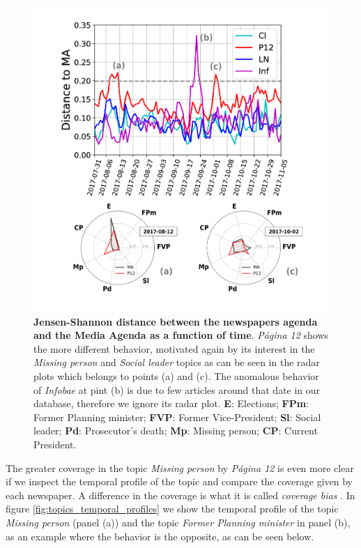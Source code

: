 \documentclass[a4paper, 12pt]{article}
\begin{document}
\begin{figure}[H]
\centering
\includegraphics[width = \textwidth]{images/Fig6.pdf}
\caption{\textbf{Jensen-Shannon distance between the newspapers agenda and the Media Agenda as a function of time}. \emph{P\'agina 12} shows the more different behavior, motivated again by its interest in the \emph{Missing person} and \emph{Social leader} topics as can be seen in the radar plots which belongs to points (a) and (c). The anomalous behavior of \emph{Infobae} at pint (b) is due to few articles around that date in our database, therefore we ignore its radar plot. \textbf{E}: Elections; \textbf{FPm}: Former Planning minister; \textbf{FVP}: Former Vice-President; \textbf{Sl}: Social leader; \textbf{Pd}: Prosecutor's death; \textbf{Mp}: Missing person; \textbf{CP}: Current President.}
\label{fig:jensen_shannon_news}
\end{figure}


\par The greater coverage in the topic \emph{Missing person} by \emph{P\'agina 12} is even more clear if we inspect the temporal profile of the topic and compare the coverage given by each newspaper. A difference in the coverage is what it is called \emph{coverage bias} \cite{dallmann2015media}.  In figure \ref{fig:topics_temporal_profiles} we show the temporal profile of the topic \emph{Missing person} (panel (a)) and the topic \emph{Former Planning minister} in panel (b), as an example where the behavior is the opposite, as can be seen below.
\end{document}
